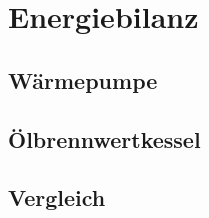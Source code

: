 \chapter{Energiebilanz}
\label{chap:bilanz}

\section{Wärmepumpe}



\section{Ölbrennwertkessel}

\section{Vergleich}


